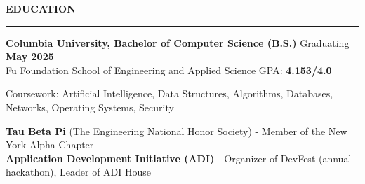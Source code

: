 \documentclass[11pt,letterpaper]{article}
\begin{document}
\medskip
\MakeUppercase{{\bf Education}}
\medskip
\hrule
\begin{list}{}{\setlength{\leftmargin}{0em}}
    \item
          {\bf Columbia University, Bachelor of Computer Science (B.S.)} \hfill  {Graduating {\bf May 2025}}\\
          Fu Foundation School of Engineering and Applied Science \hfill {GPA: {\bf 4.153/4.0}}
          
          Coursework: Artificial Intelligence, Data Structures, Algorithms, Databases, Networks, Operating Systems, Security

            {\bf Tau Beta Pi} (The Engineering National Honor Society) - Member of the New York Alpha Chapter \\
            {\bf Application Development Initiative (ADI)} - Organizer of DevFest (annual hackathon), Leader of ADI House
\end{list}

\end{document}
